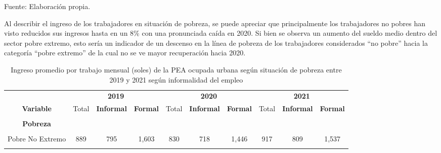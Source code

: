 \documentclass[
  letterpaper,
  12pt,
  oneside,
  spanish,
  doublespacing,
  headsepline,
  parskip]{MastersDoctoralThesis}
\begin{document}
\noindent \small Fuente: Elaboración propia. \normalsize

Al describir el ingreso de los trabajadores en situación de pobreza, se
puede apreciar que principalmente los trabajadores no pobres han visto
reducidos sus ingresos hasta en un 8\% con una pronunciada caída en
2020. Si bien se observa un aumento del sueldo medio dentro del sector
pobre extremo, esto sería un indicador de un descenso en la línea de
pobreza de los trabajadores considerados ``no pobre'' hacia la categoría
``pobre extremo'' de la cual no se ve mayor recuperación hacia 2020.

\hypertarget{tbl-ing_pobreza}{}
\begin{table}[H]
\caption{\label{tbl-ing_pobreza}Ingreso promedio por trabajo mensual (soles) de la PEA ocupada urbana
según situación de pobreza entre 2019 y 2021 según informalidad del
empleo }\tabularnewline

\centering\begingroup\fontsize{9}{11}\selectfont

\begin{tabular}{cccccccccc}
\toprule
\multicolumn{1}{c}{ } & \multicolumn{3}{c}{\textbf{2019}} & \multicolumn{3}{c}{\textbf{2020}} & \multicolumn{3}{c}{\textbf{2021}} \\
\cmidrule(l{3pt}r{3pt}){2-4} \cmidrule(l{3pt}r{3pt}){5-7} \cmidrule(l{3pt}r{3pt}){8-10}
\textbf{Variable} & Total & \textbf{Informal} & \textbf{Formal} & Total & \textbf{Informal} & \textbf{Formal} & Total & \textbf{Informal} & \textbf{Formal}\\
\midrule
\cellcolor{gray!6}{\textbf{Nacional}} & \cellcolor{gray!6}{1,595} & \cellcolor{gray!6}{1,037} & \cellcolor{gray!6}{2,599} & \cellcolor{gray!6}{1,407} & \cellcolor{gray!6}{901} & \cellcolor{gray!6}{2,380} & \cellcolor{gray!6}{1,443} & \cellcolor{gray!6}{989} & \cellcolor{gray!6}{2,473}\\
\textbf{Pobreza} &  &  &  &  &  &  &  &  & \\
\cellcolor{gray!6}{Pobre Extremo} & \cellcolor{gray!6}{555} & \cellcolor{gray!6}{551} & \cellcolor{gray!6}{815} & \cellcolor{gray!6}{550} & \cellcolor{gray!6}{526} & \cellcolor{gray!6}{864} & \cellcolor{gray!6}{682} & \cellcolor{gray!6}{646} & \cellcolor{gray!6}{1,168}\\
Pobre No Extremo & 889 & 795 & 1,603 & 830 & 718 & 1,446 & 917 & 809 & 1,537\\
\cellcolor{gray!6}{No Pobre} & \cellcolor{gray!6}{1,686} & \cellcolor{gray!6}{1,084} & \cellcolor{gray!6}{2,634} & \cellcolor{gray!6}{1,545} & \cellcolor{gray!6}{965} & \cellcolor{gray!6}{2,464} & \cellcolor{gray!6}{1,556} & \cellcolor{gray!6}{1,041} & \cellcolor{gray!6}{2,555}\\
\bottomrule
\end{tabular}
\endgroup{}
\end{table}
\end{document}
